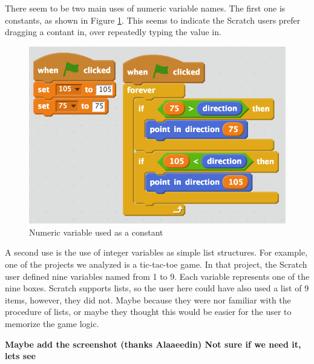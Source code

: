 \documentclass[conference]{IEEEtran}
\newcommand{\todo}[1]{ \textbf{#1} }
\begin{document}
There seem to be two main uses of numeric variable names. The first one is constants, as shown in Figure \ref{fig:constants}. This seems to indicate the Scratch users prefer dragging a contant in, over repeatedly typing the value in. 

\begin{figure}
	\begin{center}
		\includegraphics[width=\columnwidth]{fig/constants}
		\caption{Numeric variable used as a constant}
		\label{fig:constants}
	\end{center}
\end{figure} 

A second use is the use of integer variables as simple list structures. For example, one of the projects we analyzed is a tic-tac-toe game. In that project, the Scratch user defined nine variables named from 1 to 9. Each variable represents one of the nine boxes. Scratch supports lists, so the user here could have also used a list of 9 items, however, they did not. Maybe because they were nor familiar with the procedure of lists, or maybe they thought this would be easier for the user to memorize the game logic.  

\todo{Maybe add the screenshot (thanks Alaaeedin) Not sure if we need it, lets see}
\end{document}
